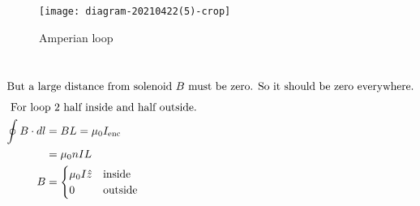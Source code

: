 \begin{minipage}{0.35\textwidth}
	\begin{figure}[H]
		\centering
		\texttt{[image: diagram-20210422(5)-crop]}
		\caption{Amperian loop}
		\label{rc current discharge}
	\end{figure}	
\end{minipage}\\
\begin{align*}
\intertext{But a large distance from solenoid $B$ must be zero. So it should be zero everywhere.}
\intertext{	For loop $2$ half inside and half outside.}
\oint {B} \cdot d {l}&=B L=\mu_{0} I_{\mathrm{enc}}\\&=\mu_{0} n I L\\
B&= \begin{cases}
\mu_0 I \hat{z}& \text{inside}\\
0    & \text{outside}
\end{cases}
\end{align*}
